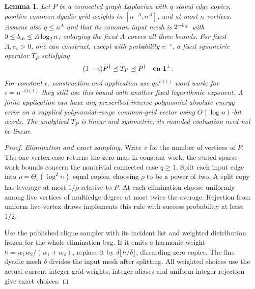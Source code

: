 \documentclass[11pt]{article}
\newtheorem{lemma}[theorem]{Lemma}
\theoremstyle{remark}
\begin{document}
\begin{lemma}
\label{lem:ram27-sparse-inverse}
Let $P$ be a connected graph Laplacian with $q$ stored edge copies, positive
common-dyadic-grid weights in $[n^{-A},n^A]$, and at most $n$ vertices.
Assume also $q\le n^A$ and that its common input mesh is $2^{-b_{\rm in}}$ with
$0\le b_{\rm in}\le A\log_2n$; enlarging the fixed $A$ covers all three bounds.
For fixed $A,c_\star>0$, one can construct, except with probability $n^{-c}$, a fixed
symmetric operator $T_P$ satisfying
\[
 (1-\epsilon)P^\dagger\preceq T_P\preceq P^\dagger
 \quad\hbox{on }\mathbf1^\perp.
\]
For constant $\epsilon$, construction and application use $qn^{o(1)}$ word
work; for $\epsilon=n^{-O(1)}$ they still use this bound with another fixed
logarithmic exponent.
A finite application can have any prescribed inverse-polynomial absolute energy
error on a supplied polynomial-range common-grid vector using $O(\log n)$-bit
words.
The analytical $T_P$ is linear and symmetric; its rounded evaluation need not be
linear.
\end{lemma} \begin{proof} \emph{Elimination and exact sampling.} Write $v$ for
the number of vertices of $P$.
The one-vertex case returns the zero map in constant work; the stated
sparse-work bounds concern the nontrivial connected case $q\ge1$.
Split each input edge into $\rho=\Theta_c(\log^2 n)$ equal copies, choosing
$\rho$ to be a power of two.
A split copy has leverage at most $1/\rho$ relative to $P$.
At each elimination choose uniformly among live vertices of multiedge degree at
most twice the average.
Rejection from uniform live-vertex draws implements this rule with success
probability at least $1/2$.

Use the published clique sampler with its incident list and weighted
distribution frozen for the whole elimination bag.
If it emits a harmonic weight $h=w_1w_2/(w_1+w_2)$, replace it by $\delta\lfloor
h/\delta\rfloor$, discarding zero copies.
The fine dyadic mesh $\delta$ divides the input mesh after splitting.
All weighted choices use the actual current integer grid weights; integer
aliases and uniform-integer rejection give exact choices.


\end{proof}
\end{document}
